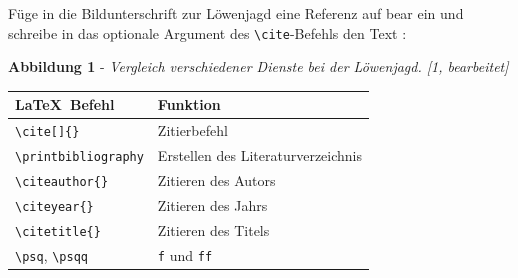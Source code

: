\documentclass["WS\space 16-17\space -\space LaTeX-Kurs\space -\space Praesentation\space -\space 3.tex"]{subfiles}
\begin{document}
\begin{frame}[fragile]
	\begin{Aufgabe}
		Füge in die Bildunterschrift zur Löwenjagd eine Referenz auf \textrm{bear} ein und schreibe in das optionale Argument des \lstinline[basicstyle=\normalfont\normalsize]|\cite|-Befehls den Text \textrm{}:
	\end{Aufgabe}
	\begin{outputbox}
		\vspace{-0.3cm}
		\begin{center}
			\textbf{Abbildung 1} - \textit{Vergleich verschiedener Dienste bei der Löwenjagd. [1, bearbeitet]}
		\end{center}
		\vspace{-0.3cm}
	\end{outputbox}
	\btVFill\Befehle
	\begin{center}
		\begin{tabular}{ll}
			\toprule
			\LaTeX\ Befehl							&	Funktion					\\ \midrule
			\lstinline|\cite[]{}|					&	Zitierbefehl\\
			\lstinline|\printbibliography|			&	Erstellen des Literaturverzeichnis\\
			\lstinline|\citeauthor{}|				&	Zitieren des Autors \\
			\lstinline|\citeyear{}|					&	Zitieren des Jahrs \\
			\lstinline|\citetitle{}|				&	Zitieren des Titels \\
			\lstinline|\psq|, \lstinline|\psqq|		&	\texttt{f} und \texttt{ff} \\
			\bottomrule
		\end{tabular}
	\end{center}
	\vspace{0.1cm}
\end{frame}
\end{document}
